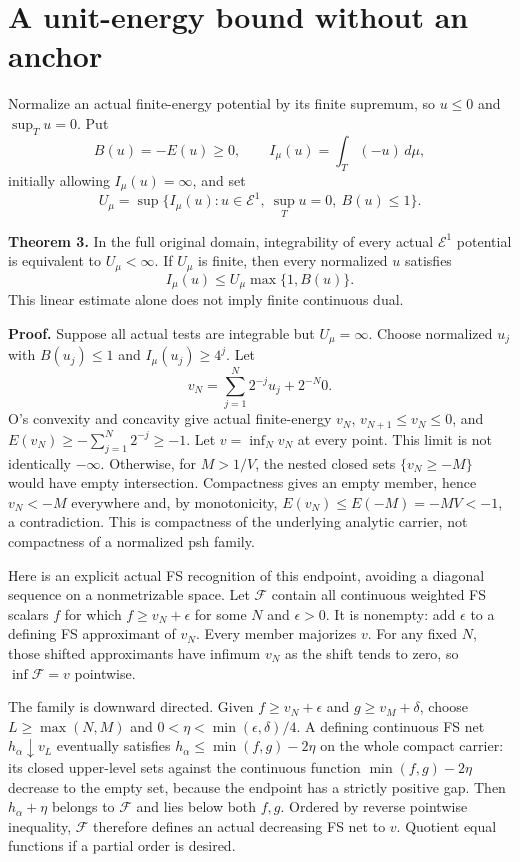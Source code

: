 \documentclass[
  11pt,
]{article}
\begin{document}
\section{A unit-energy bound without an
anchor}\label{a-unit-energy-bound-without-an-anchor}

Normalize an actual finite-energy potential by its finite supremum, so
\(u\leq0\) and \(\sup_Tu=0\). Put \[
 B(u)=-E(u)\geq0,\qquad I_\mu(u)=\int_T(-u)\,d\mu,
\] initially allowing \(I_\mu(u)=\infty\), and set \[
 U_\mu=\sup\{I_\mu(u):u\in\mathcal E^1,\ \sup_Tu=0,\ B(u)\leq1\}.
\]

\textbf{Theorem 3.} In the full original domain, integrability of every
actual \(\mathcal E^1\) potential is equivalent to \(U_\mu<\infty\). If
\(U_\mu\) is finite, then every normalized \(u\) satisfies \[
 I_\mu(u)\leq U_\mu\max\{1,B(u)\}.
\] This linear estimate alone does not imply finite continuous dual.

\textbf{Proof.} Suppose all actual tests are integrable but
\(U_\mu=\infty\). Choose normalized \(u_j\) with \(B(u_j)\leq1\) and
\(I_\mu(u_j)\geq4^j\). Let \[
 v_N=\sum_{j=1}^N2^{-j}u_j+2^{-N}0.
\] O's convexity and concavity give actual finite-energy \(v_N\),
\(v_{N+1}\leq v_N\leq0\), and \(E(v_N)\geq-\sum_{j=1}^N2^{-j}\geq-1\).
Let \(v=\inf_Nv_N\) at every point. This limit is not identically
\(-\infty\). Otherwise, for \(M>1/V\), the nested closed sets
\(\{v_N\geq-M\}\) would have empty intersection. Compactness gives an
empty member, hence \(v_N<-M\) everywhere and, by monotonicity,
\(E(v_N)\leq E(-M)=-MV<-1\), a contradiction. This is compactness of the
underlying analytic carrier, not compactness of a normalized psh family.

Here is an explicit actual FS recognition of this endpoint, avoiding a
diagonal sequence on a nonmetrizable space. Let \(\mathcal F\) contain
all continuous weighted FS scalars \(f\) for which
\(f\geq v_N+\epsilon\) for some \(N\) and \(\epsilon>0\). It is
nonempty: add \(\epsilon\) to a defining FS approximant of \(v_N\).
Every member majorizes \(v\). For any fixed \(N\), those shifted
approximants have infimum \(v_N\) as the shift tends to zero, so
\(\inf\mathcal F=v\) pointwise.

The family is downward directed. Given \(f\geq v_N+\epsilon\) and
\(g\geq v_M+\delta\), choose \(L\geq\max(N,M)\) and
\(0<\eta<\min(\epsilon,\delta)/4\). A defining continuous FS net
\(h_\alpha\downarrow v_L\) eventually satisfies
\(h_\alpha\leq\min(f,g)-2\eta\) on the whole compact carrier: its closed
upper-level sets against the continuous function \(\min(f,g)-2\eta\)
decrease to the empty set, because the endpoint has a strictly positive
gap. Then \(h_\alpha+\eta\) belongs to \(\mathcal F\) and lies below
both \(f,g\). Ordered by reverse pointwise inequality, \(\mathcal F\)
therefore defines an actual decreasing FS net to \(v\). Quotient equal
functions if a partial order is desired.
\end{document}
